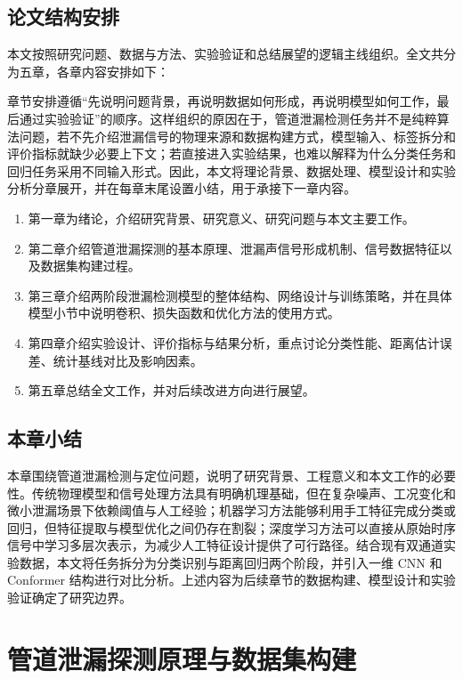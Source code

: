 \section{论文结构安排}

本文按照研究问题、数据与方法、实验验证和总结展望的逻辑主线组织。全文共分为五章，各章内容安排如下：

章节安排遵循“先说明问题背景，再说明数据如何形成，再说明模型如何工作，最后通过实验验证”的顺序。这样组织的原因在于，管道泄漏检测任务并不是纯粹算法问题，若不先介绍泄漏信号的物理来源和数据构建方式，模型输入、标签拆分和评价指标就缺少必要上下文；若直接进入实验结果，也难以解释为什么分类任务和回归任务采用不同输入形式。因此，本文将理论背景、数据处理、模型设计和实验分析分章展开，并在每章末尾设置小结，用于承接下一章内容。

\begin{enumerate}
  \item 第一章为绪论，介绍研究背景、研究意义、研究问题与本文主要工作。
  \item 第二章介绍管道泄漏探测的基本原理、泄漏声信号形成机制、信号数据特征以及数据集构建过程。
  \item 第三章介绍两阶段泄漏检测模型的整体结构、网络设计与训练策略，并在具体模型小节中说明卷积、损失函数和优化方法的使用方式。
  \item 第四章介绍实验设计、评价指标与结果分析，重点讨论分类性能、距离估计误差、统计基线对比及影响因素。
  \item 第五章总结全文工作，并对后续改进方向进行展望。
\end{enumerate}

\section{本章小结}

本章围绕管道泄漏检测与定位问题，说明了研究背景、工程意义和本文工作的必要性。传统物理模型和信号处理方法具有明确机理基础，但在复杂噪声、工况变化和微小泄漏场景下依赖阈值与人工经验；机器学习方法能够利用手工特征完成分类或回归，但特征提取与模型优化之间仍存在割裂；深度学习方法可以直接从原始时序信号中学习多层次表示，为减少人工特征设计提供了可行路径。结合现有双通道实验数据，本文将任务拆分为分类识别与距离回归两个阶段，并引入一维 CNN 和 Conformer 结构进行对比分析。上述内容为后续章节的数据构建、模型设计和实验验证确定了研究边界。

\chapter{管道泄漏探测原理与数据集构建}

